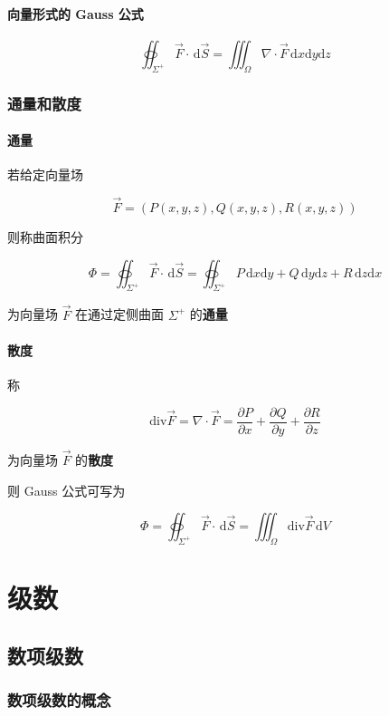 \documentclass[lang = zh , final , oneside , openany , titlepage , zihao = -4 , linespread = 1.3 , baselineskip = false , cjk-font = windows , text-font = newtx , math-font = newtx , math-style = ISO , uppercase-greek = upright , integral-limits = false]{sjtureport}
\begin{document}
\subsubsection{向量形式的 Gauss 公式}

\[\oiint_{\Sigma^+} \vec{F}\cdot\,\mathrm{d}\vec{S} = \iiint_\Omega \nabla\cdot\vec{F}\,\mathrm{d}x\mathrm{d}y\mathrm{d}z\]

\subsection{通量和散度}

\subsubsection{通量}

若给定向量场

\[\vec{F} = \left(P(x,y,z),Q(x,y,z),R(x,y,z)\right)\]

则称曲面积分

\[\Phi = \oiint_{\Sigma^+} \vec{F}\cdot\,\mathrm{d}\vec{S} = \oiint_{\Sigma^+} P\,\mathrm{d}x\mathrm{d}y + Q\,\mathrm{d}y\mathrm{d}z + R\,\mathrm{d}z\mathrm{d}x\]

为向量场 \(\vec{F}\) 在通过定侧曲面 \(\Sigma^+\) 的\textbf{通量}

\subsubsection{散度}

称

\[\mathrm{div}\vec{F} = \nabla\cdot\vec{F}=\frac{\partial P}{\partial x} + \frac{\partial Q}{\partial y} + \frac{\partial R}{\partial z}\]

为向量场 \(\vec{F}\) 的\textbf{散度}

则 Gauss 公式可写为

\[\Phi =\oiint_{\Sigma^+} \vec{F}\cdot\,\mathrm{d}\vec{S} = \iiint_\Omega \mathrm{div}\vec{F}\,\mathrm{d}V\]

\chapter{级数}

\section{数项级数}

\subsection{数项级数的概念}
\end{document}
